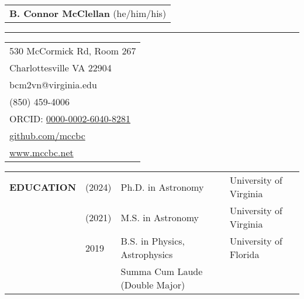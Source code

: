 \documentclass{article}
\begin{document}
\thispagestyle{empty}

\begin{tabular}{l}
    \large\textbf{B. Connor McClellan} \small(he/him/his)\\
\end{tabular}
\vspace{-0.25cm}
\begin{center}
\rule{0.92\textwidth}{.4pt}    
\end{center}
\vspace{0.1cm}
 
\begin{tabular}{l}
    530 McCormick Rd, Room 267 \\
    Charlottesville VA 22904 \\
    bcm2vn@virginia.edu \\
    (850) 459-4006 \\
     ORCID: \href{https://orcid.org/0000-0002-6040-8281}{0000-0002-6040-8281} \\
     \href{https://github.com/mccbc}{github.com/mccbc} \\
     \href{www.mccbc.net}{www.mccbc.net} \\ 
\end{tabular}

\vspace{0.5cm}
\begin{tabular}{p{4cm}p{2.2cm}ll}
    \large{\textbf{EDUCATION}} & (2024) & Ph.D. in Astronomy & University of Virginia \\
                    & (2021) & M.S. in Astronomy & University of Virginia \\
                    & 2019 & B.S. in Physics, Astrophysics &  University of Florida \\
        & & \small Summa Cum Laude (Double Major) &  \vspace{0.125cm} \\
\end{tabular}
\end{document}
